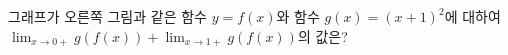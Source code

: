 \noindent\begin{minipage}[t]{0.58\linewidth}\vspace{0pt}\raggedright 그래프가 오른쪽 그림과 같은 함수 $y=f(x)$와 함수 $g(x)=(x+1)^2$에 대하여 $\displaystyle\lim_{x\to 0+} g(f(x))+\lim_{x\to 1+} g(f(x))$의 값은?\end{minipage}\hfill\begin{minipage}[t]{0.4\linewidth}\vspace{0pt}\centering \resizebox{\ifdim\width>\linewidth\linewidth\else\width\fi}{!}{}\end{minipage}\par
{}

